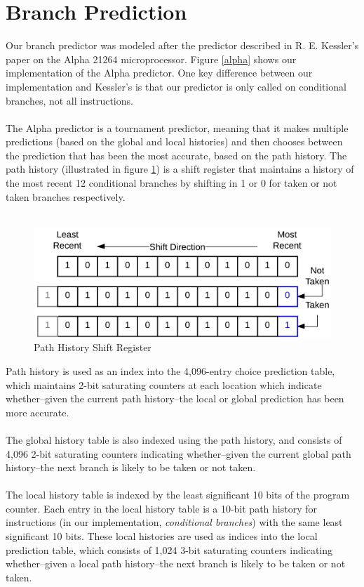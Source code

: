 \documentclass[twocolumn]{article}
\newcommand{\centerimage}[3]{
\begin{figure}[ht!]  
\begin{center} #1
\caption{#2}
\label{#3}
\end{center}
\end{figure}}
\begin{document}
\section{Branch Prediction}
Our branch predictor was modeled after the predictor described in R. E. Kessler's paper on the Alpha 21264 microprocessor.  Figure \ref{alpha} shows our implementation of the Alpha predictor.  One key difference between our implementation and Kessler's is that our predictor is only called on conditional branches, not all instructions.\\\\
The Alpha predictor is a tournament predictor, meaning that it makes multiple predictions (based on the global and local histories) and then chooses between the prediction that has  been the most accurate, based on the path history.  The path history (illustrated in figure \ref{phistory}) is a shift register that maintains a history of the most recent 12 conditional branches by shifting in 1 or 0 for taken or not taken branches respectively.\\\\
\centerimage{\includegraphics[width=\columnwidth]{phistory.png}}{Path History Shift Register}{phistory} 
Path history is used as an index into the 4,096-entry choice prediction table, which maintains 2-bit saturating counters at each location which indicate whether--given the current path history--the local or global prediction has been more accurate.\\\\  
The global history table is also indexed using the path history, and consists of 4,096 2-bit saturating counters indicating whether--given the current global path history--the next branch is likely to be taken or not taken.\\\\
The local history table is indexed by the least significant 10 bits of the program counter.  Each entry in the local history table is a 10-bit path history for instructions (in our implementation, \textit{conditional branches}) with the same least significant 10 bits.  These local histories are used as indices into the local prediction table, which consists of 1,024 3-bit saturating counters indicating whether--given a local path history--the next branch is likely to be taken or not taken.\\\\
\end{document}
